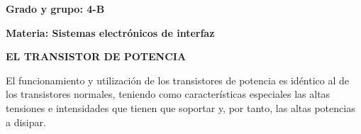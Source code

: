 \documentclass[12pt]{article}
\begin{document}

\par


\vspace{\baselineskip}

\vspace{\baselineskip}

\vspace{\baselineskip}

\vspace{\baselineskip}

\vspace{\baselineskip}

\vspace{\baselineskip}

\vspace{\baselineskip}

\vspace{\baselineskip}

\vspace{\baselineskip}

\vspace{\baselineskip}

\vspace{\baselineskip}

\vspace{\baselineskip}

\vspace{\baselineskip}

\vspace{\baselineskip}

\vspace{\baselineskip}
{\fontsize{22pt}{26.4pt}\selectfont \textbf{Grado y grupo: 4-B}\par}\par

{\fontsize{22pt}{26.4pt}\selectfont \textbf{Materia: Sistemas electrónicos de interfaz}\par}\par


\vspace{\baselineskip}
{\fontsize{22pt}{26.4pt}\selectfont \textbf{EL TRANSISTOR DE POTENCIA}\par}\par


\vspace{\baselineskip}
El funcionamiento y utilización de los transistores de potencia es idéntico al de los transistores normales, teniendo como características especiales las altas tensiones e intensidades que tienen que soportar y, por tanto, las altas potencias a disipar. \par
\end{document}
